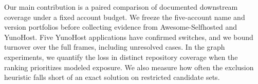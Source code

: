 Our main contribution is a paired comparison of documented downstream coverage under a fixed account budget. We freeze the five-account name and version portfolios before collecting evidence from Awesome-Selfhosted and YunoHost. Five YunoHost applications have confirmed switches, and we bound turnover over the full frames, including unresolved cases. In the graph experiments, we quantify the loss in distinct repository coverage when the ranking prioritizes modeled exposure. We also measure how often the exclusion heuristic falls short of an exact solution on restricted candidate sets.
